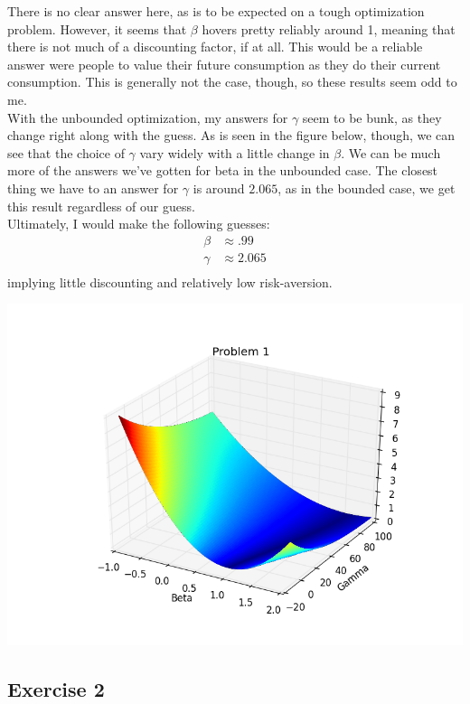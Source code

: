\documentclass[letterpaper,12pt]{article}
\theoremstyle{definition}
\begin{document}
There is no clear answer here, as is to be expected on a tough optimization problem. However, it seems that $\beta$ hovers pretty reliably around 1, meaning that there is not much of a discounting factor, if at all. This would be a reliable answer were people to value their future consumption as they do their current consumption. This is generally not the case, though, so these results seem odd to me. \\
\indent With the unbounded optimization, my answers for $\gamma$ seem to be bunk, as they change right along with the guess. As is seen in the figure below, though, we can see that the choice of $\gamma$ vary widely with a little change in $\beta$. We can be much more of the answers we've gotten for beta in the unbounded case. The closest thing we have to an answer for $\gamma$ is around $2.065$, as in the bounded case, we get this result regardless of our guess. \\
\indent Ultimately, I would make the following guesses:
\begin{align*}
\beta &\approx .99\\
\gamma&\approx 2.065\\
\end{align*} 
implying little discounting and relatively low risk-aversion.

\includegraphics[scale = .75]{betagammafig.png}


\subsection*{Exercise 2}
\end{document}
